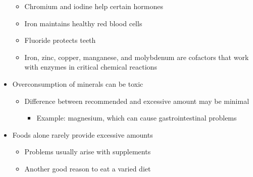 \documentclass[12pt]{article}
\begin{document}
\begin{itemize}
\begin{itemize}
                        \item Chromium and iodine help certain hormones
                        \item Iron maintains healthy red blood cells
                        \item Fluoride protects teeth
                        \item Iron, zinc, copper, manganese, and molybdenum are cofactors that work with enzymes in critical chemical reactions
                    \end{itemize}
                \item Overconsumption of minerals can be toxic
                    \begin{itemize}
                        \item Difference between recommended and excessive amount may be minimal
                            \begin{itemize}
                                \item Example: magnesium, which can cause gastrointestinal problems
                            \end{itemize}
                    \end{itemize}
                \item Foods alone rarely provide excessive amounts
                    \begin{itemize}
                        \item Problems usually arise with supplements
                        \item Another good reason to eat a varied diet
                    \end{itemize}
            \end{itemize}
            
\end{document}
